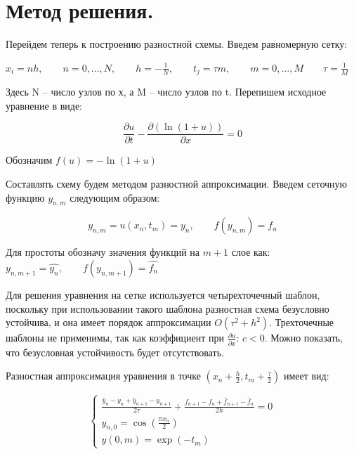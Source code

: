 \documentclass[a4paper,14pt]{article}
\begin{document}
\section{Метод решения.}
Перейдем теперь к построению разностной схемы. Введем равномерную сетку:

$x_i=nh,\qquad n = 0,...,N, \qquad h = -\frac{1}{N}, \qquad  t_j=\tau m, \qquad m = 0,...,M \qquad \tau=\frac{1}{M}$

Здесь N – число узлов по х, а M – число узлов по t. Перепишем исходное уравнение в виде:

$$\frac{\partial u}{\partial t} - \frac{\partial (\ln(1+u))}{\partial x}=0$$

\noindent Обозначим $f(u) = -\ln(1+u)$

Составлять схему будем методом разностной аппроксимации. Введем сеточную функцию $y_{n,m}$ следующим образом: 

$$y_{n,m} = u(x_n,t_m)=y_n, \qquad f(y_{n,m})=f_n$$

Для простоты обозначу значения функций на $m+1$ слое как: $y_{n,m+1} = \hat{y_n}, \qquad f(y_{n,m+1})=\hat{f_n}$

Для решения уравнения на сетке используется четырехточечный шаблон, поскольку при
использовании такого шаблона разностная схема безусловно устойчива, и она имеет
порядок аппроксимации $O(\tau^2 + h^2)$. Трехточечные шаблоны не применимы, так как коэффициент при $\frac{\partial u}{\partial x}$: $c<0$. Можно показать, что безусловная устойчивость будет отсутствовать. 

Разностная аппроксимация уравнения в точке $(x_n + \frac{h}{2}, t_m + \frac{\tau}{2})$ имеет вид:

\begin{equation*}
\begin{cases}
   \frac{\hat{y}_n-y_n+\hat{y}_{n+1}-y_{n+1}}{2 \tau} + \frac{f_{n+1}-f_n+\hat{f}_{n+1}-\hat{f}_n}{2 h}=0\\
   y_{n, 0}=\cos(\frac{\pi x_n}{2})\\
   y(0,m)= \exp(-t_m)
 \end{cases}
\end{equation*}
\end{document}
